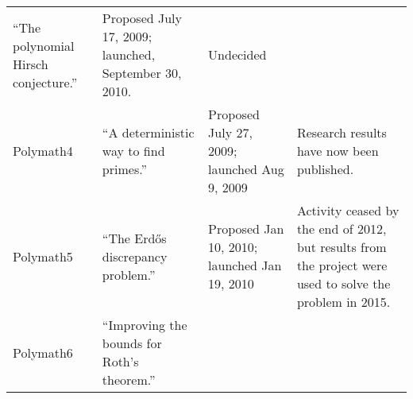 \documentclass[article, floatfix, groupaddress, prb]{revtex4-1}
\begin{document}
\begin{longtable}[c]{@{}llll@{}}
\begin{minipage}[t]{0.10\columnwidth}\raggedright\strut
``The polynomial Hirsch conjecture.''
\strut\end{minipage} &
\begin{minipage}[t]{0.09\columnwidth}\raggedright\strut
Proposed July 17, 2009; launched, September 30, 2010.
\strut\end{minipage} &
\begin{minipage}[t]{0.09\columnwidth}\raggedright\strut
Undecided
\strut\end{minipage}\tabularnewline
\begin{minipage}[t]{0.11\columnwidth}\raggedright\strut
Polymath4
\strut\end{minipage} &
\begin{minipage}[t]{0.10\columnwidth}\raggedright\strut
``A deterministic way to find primes.''
\strut\end{minipage} &
\begin{minipage}[t]{0.09\columnwidth}\raggedright\strut
Proposed July 27, 2009; launched Aug 9, 2009
\strut\end{minipage} &
\begin{minipage}[t]{0.09\columnwidth}\raggedright\strut
Research results have now been published.
\strut\end{minipage}\tabularnewline
\begin{minipage}[t]{0.11\columnwidth}\raggedright\strut
Polymath5
\strut\end{minipage} &
\begin{minipage}[t]{0.10\columnwidth}\raggedright\strut
``The Erdős discrepancy problem.''
\strut\end{minipage} &
\begin{minipage}[t]{0.09\columnwidth}\raggedright\strut
Proposed Jan 10, 2010; launched Jan 19, 2010
\strut\end{minipage} &
\begin{minipage}[t]{0.09\columnwidth}\raggedright\strut
Activity ceased by the end of 2012, but results from the project were
used to solve the problem in 2015.
\strut\end{minipage}\tabularnewline
\begin{minipage}[t]{0.11\columnwidth}\raggedright\strut
Polymath6
\strut\end{minipage} &
\begin{minipage}[t]{0.10\columnwidth}\raggedright\strut
``Improving the bounds for Roth's theorem.''
\strut\end{minipage} &
\begin{minipage}[t]{0.09\columnwidth}\raggedright\strut

\end{minipage}
\end{longtable}
\end{document}
